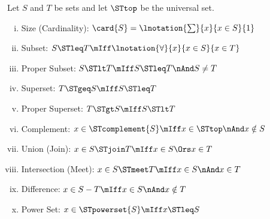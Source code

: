 \begin{definition}
\label{def:setoperations}	
	Let $S$ and $T$ be sets and let $\STtop$ be the universal set.
	\begin{enumerate}[(i)]
		\item Size (Cardinality): \quad $\card{S} = \lnotation{\sum}{x}{x \in S}{1}$
		\item Subset: \quad $S \STleq T \mIff \lnotation{\forall}{x}{x \in S}{x \in T}$
		\item Proper Subset: \quad $S \STlt T \mIff S \STleq T \nAnd S \neq T$
		\item Superset: \quad $T \STgeq S \mIff S \STleq T$
		\item Proper Superset: \quad $T \STgt S \mIff S \STlt T$
		\item Complement: \quad $x \in \STcomplement{S} \mIff x \in \STtop \nAnd x \notin S$
		\item Union (Join): \quad $x \in S \STjoin T \mIff x \in S \Ors x \in T$
		\item Intersection (Meet): \quad $x \in S \STmeet T \mIff x \in S \nAnd x \in T$
		\item Difference: \quad $x \in S - T \mIff x \in S \nAnd x \notin T$
		\item Power Set: \quad $x \in \STpowerset{S} \mIff x \STleq S$
	\end{enumerate}
\end{definition}